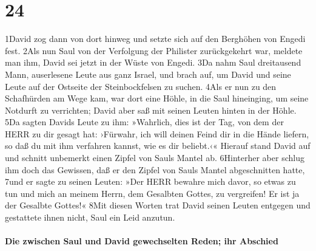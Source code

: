 \hypertarget{section-23}{%
\section{24}\label{section-23}}

1David zog dann von dort hinweg und setzte sich auf den Berghöhen von
Engedi fest. 2Als nun Saul von der Verfolgung der Philister
zurückgekehrt war, meldete man ihm, David sei jetzt in der Wüste von
Engedi. 3Da nahm Saul dreitausend Mann, auserlesene Leute aus ganz
Israel, und brach auf, um David und seine Leute auf der Ostseite der
Steinbockfelsen zu suchen. 4Als er nun zu den Schafhürden am Wege kam,
war dort eine Höhle, in die Saul hineinging, um seine Notdurft zu
verrichten; David aber saß mit seinen Leuten hinten in der Höhle. 5Da
sagten Davids Leute zu ihm: »Wahrlich, dies ist der Tag, von dem der
HERR zu dir gesagt hat: ›Fürwahr, ich will deinen Feind dir in die Hände
liefern, so daß du mit ihm verfahren kannst, wie es dir beliebt.‹«
Hierauf stand David auf und schnitt unbemerkt einen Zipfel von Sauls
Mantel ab. 6Hinterher aber schlug ihm doch das Gewissen, daß er den
Zipfel von Sauls Mantel abgeschnitten hatte, 7und er sagte zu seinen
Leuten: »Der HERR bewahre mich davor, so etwas zu tun und mich an meinem
Herrn, dem Gesalbten Gottes, zu vergreifen! Er ist ja der Gesalbte
Gottes!« 8Mit diesen Worten trat David seinen Leuten entgegen und
gestattete ihnen nicht, Saul ein Leid anzutun.

\hypertarget{die-zwischen-saul-und-david-gewechselten-reden-ihr-abschied}{%
\paragraph{Die zwischen Saul und David gewechselten Reden; ihr
Abschied}\label{die-zwischen-saul-und-david-gewechselten-reden-ihr-abschied}}

